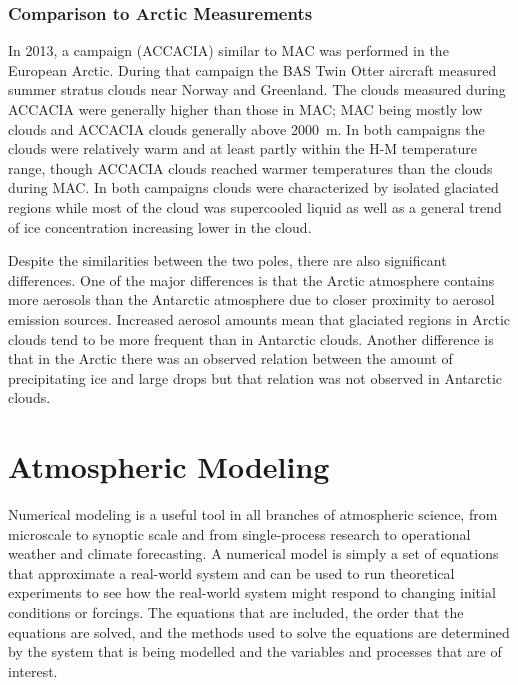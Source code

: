 \subsection{Comparison to Arctic Measurements}
In 2013, a campaign (ACCACIA) similar to MAC was performed in the European Arctic. During that campaign the BAS Twin Otter aircraft measured summer stratus clouds near Norway and Greenland. The clouds measured during ACCACIA were generally higher than those in MAC; MAC being mostly low clouds and ACCACIA clouds generally above \SI{2000}{m}. In both campaigns the clouds were relatively warm and at least partly within the H-M temperature range, though ACCACIA clouds reached warmer temperatures than the clouds during MAC. In both campaigns clouds were characterized by isolated glaciated regions while most of the cloud was supercooled liquid as well as a general trend of ice concentration increasing lower in the cloud. \citep{lloy2015,oshea2017}

Despite the similarities between the two poles, there are also significant differences. One of the major differences is that the Arctic atmosphere contains more aerosols than the Antarctic atmosphere due to closer proximity to aerosol emission sources. Increased aerosol amounts mean that glaciated regions in Arctic clouds tend to be more frequent than in Antarctic clouds. Another difference is that in the Arctic there was an observed relation between the amount of precipitating ice and large drops but that relation was not observed in Antarctic clouds. \citep{lloy2015,oshea2017}

\chapter{Atmospheric Modeling} \label{ch:modeling}
Numerical modeling is a useful tool in all branches of atmospheric science, from microscale to synoptic scale and from single-process research to operational weather and climate forecasting. A numerical model is simply a set of equations that approximate a real-world system and can be used to run theoretical experiments to see how the real-world system might respond to changing initial conditions or forcings. The equations that are included, the order that the equations are solved, and the methods used to solve the equations are determined by the system that is being modelled and the variables and processes that are of interest.

